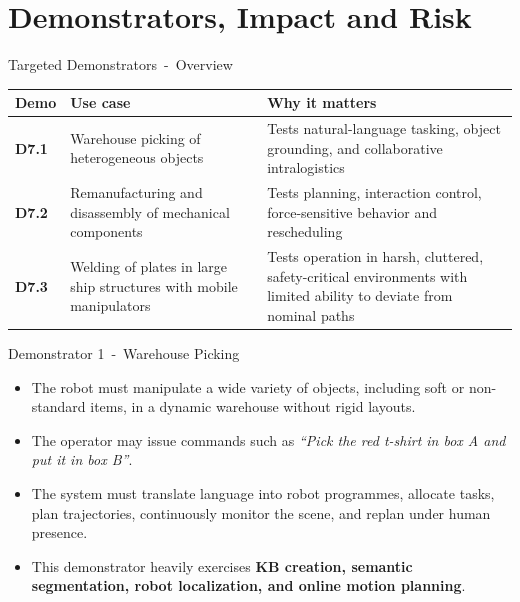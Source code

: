 \documentclass[aspectratio=169,10pt]{beamer}
\begin{document}
\section{Demonstrators, Impact and Risk}

\begin{frame}{Targeted Demonstrators~-~Overview}

\small
\begin{tabularx}{\textwidth}{>{\bfseries}p{} X X}
\toprule
Demo & Use case & Why it matters \\
\midrule
D7.1 & Warehouse picking of heterogeneous objects & Tests natural-language tasking, object grounding, and collaborative intralogistics \\
D7.2 & Remanufacturing and disassembly of mechanical components & Tests planning, interaction control, force-sensitive behavior and rescheduling \\
D7.3 & Welding of plates in large ship structures with mobile manipulators & Tests operation in harsh, cluttered, safety-critical environments with limited ability to deviate from nominal paths \\
\bottomrule
\end{tabularx}

\end{frame}


\begin{frame}{Demonstrator 1~-~Warehouse Picking}

\begin{itemize}
  \item The robot must manipulate a wide variety of objects, including soft or non-standard items, in a dynamic warehouse without rigid layouts.
  \item The operator may issue commands such as \textit{``Pick the red t-shirt in box A and put it in box B''}.
  \item The system must translate language into robot programmes, allocate tasks, plan trajectories, continuously monitor the scene, and replan under human presence.
  \item This demonstrator heavily exercises \textbf{KB creation, semantic segmentation, robot localization, and online motion planning}. 
\end{itemize}

\end{frame}
\end{document}
